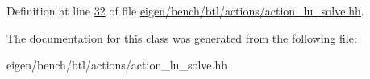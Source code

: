Definition at line \hyperlink{eigen_2bench_2btl_2actions_2action__lu__solve_8hh_source_l00032}{32} of file \hyperlink{eigen_2bench_2btl_2actions_2action__lu__solve_8hh_source}{eigen/bench/btl/actions/action\+\_\+lu\+\_\+solve.\+hh}.



The documentation for this class was generated from the following file\+:\begin{DoxyCompactItemize}
\item 
eigen/bench/btl/actions/action\+\_\+lu\+\_\+solve.\+hh\end{DoxyCompactItemize}
